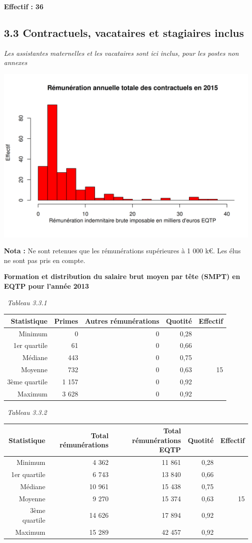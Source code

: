 \textbf{Effectif : 36 }

\hypertarget{contractuels-vacataires-et-stagiaires-inclus-1}{%
\subsection{3.3 Contractuels, vacataires et stagiaires
inclus}\label{contractuels-vacataires-et-stagiaires-inclus-1}}

\emph{Les assistantes maternelles et les vacataires sont ici inclus,
pour les postes non annexes}

\includegraphics{altair_files/figure-latex/unnamed-chunk-94-1.png}

\textbf{Nota :} Ne sont retenues que les rémunérations supérieures à 1
000 k€. Les élus ne sont pas pris en compte.

\textbf{Formation et distribution du salaire brut moyen par tête (SMPT)
en EQTP pour l'année 2013 }

~\emph{Tableau 3.3.1}

\begin{longtable}[]{@{}rrrrr@{}}
\toprule
Statistique & Primes & Autres rémunérations & Quotité &
Effectif\tabularnewline
\midrule
\endhead
Minimum & 0 & 0 & 0,28 &\tabularnewline
1er quartile & 61 & 0 & 0,66 &\tabularnewline
Médiane & 443 & 0 & 0,75 &\tabularnewline
Moyenne & 732 & 0 & 0,63 & 15\tabularnewline
3ème quartile & 1 157 & 0 & 0,92 &\tabularnewline
Maximum & 3 628 & 0 & 0,92 &\tabularnewline
\bottomrule
\end{longtable}

~\emph{Tableau 3.3.2}

\begin{longtable}[]{@{}rrrrr@{}}
\toprule
Statistique & Total rémunérations & Total rémunérations EQTP & Quotité &
Effectif\tabularnewline
\midrule
\endhead
Minimum & 4 362 & 11 861 & 0,28 &\tabularnewline
1er quartile & 6 743 & 13 840 & 0,66 &\tabularnewline
Médiane & 10 961 & 15 438 & 0,75 &\tabularnewline
Moyenne & 9 270 & 15 374 & 0,63 & 15\tabularnewline
3ème quartile & 14 626 & 17 894 & 0,92 &\tabularnewline
Maximum & 15 289 & 42 457 & 0,92 &\tabularnewline
\bottomrule
\end{longtable}

